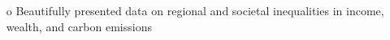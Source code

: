 

\begin{frame}
  \begin{small}
              
  \begin{columns}
    \begin{itemize}\setlength\itemsep{1.0ex}\footnotesize
      \item[o] Beautifully presented data on regional and societal inequalities in income, wealth, and carbon emissions
    \end{itemize}
  \end{columns}

  \end{small}
  \end{frame}

